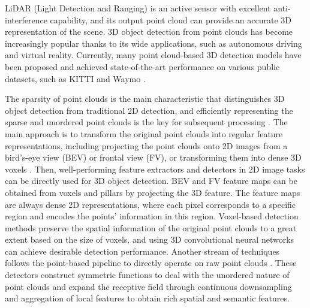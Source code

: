 LiDAR (Light Detection and Ranging) is an active sensor with excellent anti-interference capability, and its output point cloud can provide an accurate 3D representation of the scene. 3D object detection from point clouds has become increasingly popular thanks to its wide applications, such as autonomous driving and virtual reality. Currently, many point cloud-based 3D detection models have been proposed and achieved state-of-the-art performance on various public datasets, such as KITTI \cite{geiger2012we} and Waymo \cite{sun2020scalability}.

The sparsity of point clouds is the main characteristic that distinguishes 3D object detection from traditional 2D detection, and efficiently representing the sparse and unordered point clouds is the key for subsequent processing \cite{fan2021rangedet}. The main approach is to transform the original point clouds into regular feature representations, including projecting the point clouds onto 2D images from a bird's-eye view (BEV) or frontal view (FV), or transforming them into dense 3D voxels \cite{simon_complex-yolo_2018,noauthor_multi-view_nodate,beltran2018birdnet,zeng2018rt3d,ali2018yolo3d,barrera2020birdnet+,CHEN2023110952}. Then, well-performing feature extractors and detectors in 2D image tasks can be directly used for 3D object detection. BEV and FV feature maps can be obtained from voxels and pillars by projecting the 3D feature. The feature maps are always dense 2D representations, where each pixel corresponds to a specific region and encodes the points' information in this region. Voxel-based detection methods preserve the spatial information of the original point clouds to a great extent based on the size of voxels, and using 3D convolutional neural networks can achieve desirable detection performance. Another stream of techniques follows the point-based pipeline to directly operate on raw point clouds \cite{zheng2021se, zhang2022not, shi2019pointrcnn, shi2020point, yang20203dssd, hu2021learning, hu2021sqn, hu2022sensaturban, wei2022spatial}. These detectors construct symmetric functions to deal with the unordered nature of point clouds and expand the receptive field through continuous downsampling and aggregation of local features to obtain rich spatial and semantic features.

